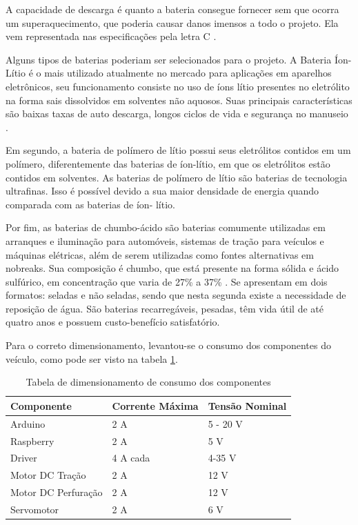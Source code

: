 \begin{itemize}
    A capacidade de descarga é quanto a bateria consegue fornecer sem que ocorra um superaquecimento, que poderia
    causar danos imensos a todo o projeto. Ela vem representada nas especificações pela letra C \cite{MEGGLIAR}.

    Alguns tipos de baterias poderiam ser selecionados para o projeto. A Bateria Íon- Lítio é o mais utilizado atualmente
    no mercado para aplicações em aparelhos eletrônicos, seu funcionamento consiste no uso de íons lítio presentes no
    eletrólito na forma sais dissolvidos em solventes não aquosos. Suas principais características são baixas taxas de auto
    descarga, longos ciclos de vida e segurança no manuseio \cite{castillo2002advances}.

    Em segundo, a bateria de polímero de lítio possui seus eletrólitos contidos em um polímero, diferentemente das baterias
    de íon-lítio, em que os eletrólitos estão contidos em solventes. As baterias de polímero de lítio são baterias de tecnologia
    ultrafinas. Isso é possível devido a sua maior densidade de energia quando comparada com as baterias de íon- lítio.

    Por fim, as baterias de chumbo-ácido são baterias comumente utilizadas em arranques e iluminação para automóveis,
    sistemas de tração para veículos e máquinas elétricas, além de serem utilizadas como fontes alternativas em nobreaks.
    Sua composição é chumbo, que está presente na forma sólida e ácido sulfúrico, em concentração que varia de 27\% a 37\% 
    \cite{pulsada2005juliano}. Se apresentam em dois formatos: seladas e não seladas, sendo que nesta segunda existe a necessidade de
    reposição de água. São baterias recarregáveis, pesadas, têm vida útil de até quatro anos e possuem custo-benefício satisfatório.

    Para o correto dimensionamento, levantou-se o consumo dos componentes do veículo, como pode ser visto na tabela \ref{tabeladimensionamento}.

     \begin{table}[!htbp]
     \centering
     \caption{Tabela de dimensionamento de consumo dos componentes}
     \label{tabeladimensionamento}
     \begin{tabular}{|p{4cm}|p{4cm}|p{4cm}|}
     \hline
     Componente          & Corrente Máxima & Tensão Nominal \\\hline
     Arduino             & 2 A             & 5 - 20 V       \\\hline
     Raspberry           & 2 A             & 5 V            \\\hline
     Driver              & 4 A cada        & 4-35 V         \\\hline
     Motor DC Tração     & 2 A         & 12 V           \\\hline
     Motor DC Perfuração & 2 A         & 12 V           \\\hline
     Servomotor          & 2 A             & 6 V            \\\hline
     \end{tabular}
     \end{table}


\end{itemize}
